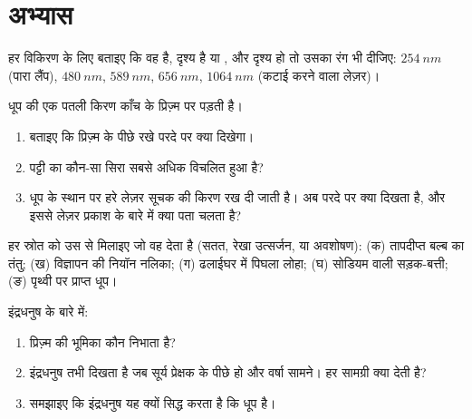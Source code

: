 \section{अभ्यास}

\begin{exercise}[$\star$]\label{exo:g10:light-spectra:1}
हर विकिरण के लिए बताइए कि वह  है, दृश्य है या
, और दृश्य हो तो उसका रंग भी दीजिए: $\qty{254}{nm}$ (पारा लैंप),
$\qty{480}{nm}$, $\qty{589}{nm}$, $\qty{656}{nm}$, $\qty{1064}{nm}$ (कटाई करने वाला लेज़र)।
\end{exercise}

\begin{exercise}[$\star$]\label{exo:g10:light-spectra:2}
धूप की एक पतली किरण काँच के प्रिज़्म पर पड़ती है।
\begin{enumerate}
  \item बताइए कि प्रिज़्म के पीछे रखे परदे पर क्या दिखेगा।
  \item पट्टी का कौन-सा सिरा सबसे अधिक विचलित हुआ है?
  \item धूप के स्थान पर हरे लेज़र सूचक की किरण रख दी जाती है। अब परदे
        पर क्या दिखता है, और इससे लेज़र प्रकाश के बारे में क्या पता
        चलता है?
\end{enumerate}
\end{exercise}

\begin{exercise}[$\star$]\label{exo:g10:light-spectra:3}
हर स्रोत को उस  से मिलाइए जो वह देता है (सतत, रेखा
उत्सर्जन, या अवशोषण): (क) तापदीप्त बल्ब का तंतु; (ख) विज्ञापन की नियॉन
नलिका; (ग) ढलाईघर में पिघला लोहा; (घ) सोडियम वाली सड़क-बत्ती; (ङ)
पृथ्वी पर प्राप्त धूप।
\end{exercise}

\begin{exercise}[$\star$]\label{exo:g10:light-spectra:4}
इंद्रधनुष के बारे में:
\begin{enumerate}
  \item प्रिज़्म की भूमिका कौन निभाता है?
  \item इंद्रधनुष तभी दिखता है जब सूर्य प्रेक्षक के पीछे हो और वर्षा
        सामने। हर सामग्री क्या देती है?
  \item समझाइए कि इंद्रधनुष यह क्यों सिद्ध करता है कि धूप
         है।
\end{enumerate}
\end{exercise}

